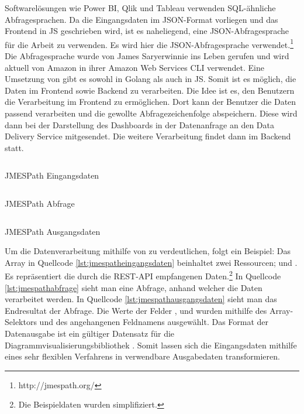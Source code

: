 Softwarelösungen wie Power BI, Qlik und Tableau verwenden SQL-ähnliche Abfragesprachen.
Da die Eingangsdaten im JSON-Format vorliegen und das Frontend in JS geschrieben wird,
ist es naheliegend, eine JSON-Abfragesprache für die Arbeit zu verwenden. Es wird hier die
JSON-Abfragesprache  verwendet.\footnote{http://jmespath.org/}
Die Abfragesprache wurde von James Saryerwinnie ins Leben gerufen und wird aktuell von
Amazon in ihrer Amazon Web Services CLI verwendet.\cite{AWSJMESPath} Eine Umsetzung von
 gibt es sowohl in Golang als auch in JS. Somit ist es möglich, die Daten im
Frontend sowie Backend zu verarbeiten. Die Idee ist es, den Benutzern die Verarbeitung
im Frontend zu ermöglichen. Dort kann der Benutzer die Daten passend verarbeiten und die
gewollte Abfragezeichenfolge abspeichern. Diese wird dann bei der Darstellung des 
Dashboards in der Datenanfrage an den Data Delivery Service mitgesendet.
Die weitere Verarbeitung findet dann im Backend statt.

\begin{listing}[]
    \inputminted{jsx}{snippets/json/jmespath-example/jmespathinput.json}
    \caption{JMESPath Eingangsdaten}
    \label{lst:jmespatheingangsdaten}
\end{listing}

\begin{listing}[]
    \inputminted{jsx}{snippets/json/jmespath-example/jmespathquery.txt}
    \caption{JMESPath Abfrage}
    \label{lst:jmespathabfrage}
\end{listing}

\begin{listing}[]
    \inputminted{jsx}{snippets/json/jmespath-example/jmespathoutput.json}
    \caption{JMESPath Ausgangsdaten}
    \label{lst:jmespathausgangsdaten}
\end{listing}

Um die Datenverarbeitung mithilfe von  zu verdeutlichen, folgt ein
Beispiel: Das Array in Quellcode \ref{lst:jmespatheingangsdaten} beinhaltet zwei Ressourcen;
 und . Es repräsentiert die durch die REST-API empfangenen
Daten.\footnote{Die Beispieldaten wurden simplifiziert.} In Quellcode \ref{lst:jmespathabfrage}
sieht man eine Abfrage, anhand welcher die Daten verarbeitet werden. In Quellcode \ref{lst:jmespathausgangsdaten}
sieht man das Endresultat der Abfrage. Die Werte der Felder ,  und 
wurden mithilfe des Array-Selektors \code{[]} und des angehangenen Feldnamens ausgewählt.
Das Format der Datenausgabe ist ein gültiger Datensatz für die Diagrammvisualisierungsbibliothek
. Somit lassen sich die Eingangsdaten mithilfe eines sehr flexiblen Verfahrens
in verwendbare Ausgabedaten transformieren.

